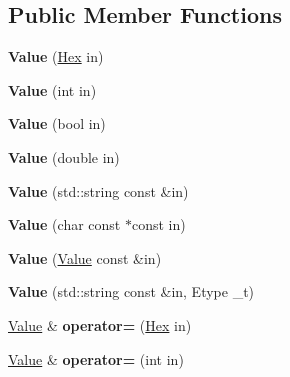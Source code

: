 \subsection*{Public Member Functions}
\begin{DoxyCompactItemize}
\item 
\hypertarget{classValue_ae571dc87a1b3aa28b77ad1c71806fac3}{{\bfseries Value} (\hyperlink{classHex}{Hex} in)}\label{classValue_ae571dc87a1b3aa28b77ad1c71806fac3}

\item 
\hypertarget{classValue_a51dc47b1234df29a55e5b9464197f92a}{{\bfseries Value} (int in)}\label{classValue_a51dc47b1234df29a55e5b9464197f92a}

\item 
\hypertarget{classValue_ade711e44b478c4642e0c67740fbeb0d1}{{\bfseries Value} (bool in)}\label{classValue_ade711e44b478c4642e0c67740fbeb0d1}

\item 
\hypertarget{classValue_a9bff44d96e7c5338429836a88e17523e}{{\bfseries Value} (double in)}\label{classValue_a9bff44d96e7c5338429836a88e17523e}

\item 
\hypertarget{classValue_aea5dab0eef83bbb3e5b0389bbeddaa49}{{\bfseries Value} (std\-::string const \&in)}\label{classValue_aea5dab0eef83bbb3e5b0389bbeddaa49}

\item 
\hypertarget{classValue_a325758ee5a8490e7998707e69c9dbf1c}{{\bfseries Value} (char const $\ast$const in)}\label{classValue_a325758ee5a8490e7998707e69c9dbf1c}

\item 
\hypertarget{classValue_a84847a7572266a87736adfd9593889a8}{{\bfseries Value} (\hyperlink{classValue}{Value} const \&in)}\label{classValue_a84847a7572266a87736adfd9593889a8}

\item 
\hypertarget{classValue_aa1d9738269561a6222d62bf93dffff4f}{{\bfseries Value} (std\-::string const \&in, Etype \-\_\-t)}\label{classValue_aa1d9738269561a6222d62bf93dffff4f}

\item 
\hypertarget{classValue_aa5cfc92aa1824df25992ca212c105b9d}{\hyperlink{classValue}{Value} \& {\bfseries operator=} (\hyperlink{classHex}{Hex} in)}\label{classValue_aa5cfc92aa1824df25992ca212c105b9d}

\item 
\hypertarget{classValue_aa0c9cfd5e17ac6df6763cf00f83c695c}{\hyperlink{classValue}{Value} \& {\bfseries operator=} (int in)}\label{classValue_aa0c9cfd5e17ac6df6763cf00f83c695c}


\end{DoxyCompactItemize}
